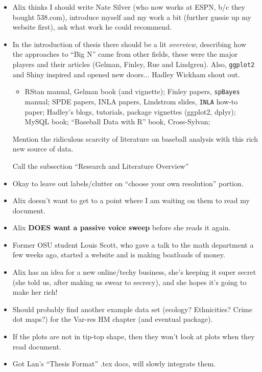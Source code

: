 \documentclass{article}
\begin{document}
\begin{itemize}
\item Alix thinks I should write Nate Silver (who now works at ESPN, b/c they bought 538.com), introduce myself and my work a bit (further gussie up my website first), ask what work he could recommend.
\item In the introduction of thesis there should be a lit {\it overview}, describing how the approaches to ``Big N'' came from other fields, these were the major players and their articles (Gelman, Finley, Rue and Lindgren). Also, \verb|ggplot2| and Shiny inspired and opened new doors... Hadley Wickham shout out.
  \begin{itemize}
  \item RStan manual, Gelman book (and vignette); Finley papers, \verb|spBayes| manual; SPDE papers, INLA papers, Lindstrom slides, \verb|INLA| how-to paper; Hadley's blogs, tutorials, package vignettes (ggplot2, dplyr); MySQL book; ``Baseball Data with R'' book, Cross-Sylvan;
  \end{itemize}
Mention the ridiculous scarcity of literature on baseball analysis with this rich new source of data.

Call the subsection ``Research and Literature Overview''
\item Okay to leave out labels/clutter on ``choose your own resolution'' portion.
\item Alix doesn't want to get to a point where I am waiting on them to read my document.
\item Alix {\bf DOES want a passive voice sweep} before she reads it again.
\item Former OSU student Louis Scott, who gave a talk to the math department a few weeks ago, started a website and is making boatloads of money.
\item Alix has an idea for a new online/techy business, she's keeping it super secret (she told us, after making us swear to secrecy), and she hopes it's going to make her rich!
\item Should probably find another example data set (ecology? Ethnicities? Crime dot maps?) for the Var-res HM chapter (and eventual package).
\item If the plots are not in tip-top shape, then they won't look at plots when they read document.
\item Got Lan's ``Thesis Format'' .tex docs, will slowly integrate them.
\end{itemize}
\end{document}
